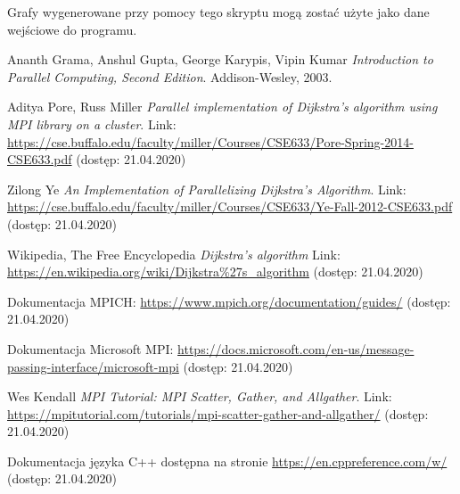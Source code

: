 \documentclass[12pt]{article}
\begin{document}
Grafy wygenerowane przy pomocy tego skryptu mogą zostać użyte jako dane wejściowe do programu.


\newpage
\begin{thebibliography}{9}
Ananth Grama, Anshul Gupta, George Karypis, Vipin Kumar 
\textit{Introduction to Parallel Computing, Second Edition}. 
Addison-Wesley, 2003.

Aditya Pore, Russ Miller
\textit{Parallel implementation of Dijkstra's algorithm using MPI library on a cluster}.
Link: \url{https://cse.buffalo.edu/faculty/miller/Courses/CSE633/Pore-Spring-2014-CSE633.pdf} (dostęp: 21.04.2020)

Zilong Ye
\textit{An Implementation of Parallelizing Dijkstra’s Algorithm}.
Link: \url{https://cse.buffalo.edu/faculty/miller/Courses/CSE633/Ye-Fall-2012-CSE633.pdf} (dostęp: 21.04.2020)

Wikipedia, The Free Encyclopedia
\textit{Dijkstra's algorithm}
Link: \url{https://en.wikipedia.org/wiki/Dijkstra\%27s_algorithm} (dostęp: 21.04.2020)

Dokumentacja MPICH: \url{https://www.mpich.org/documentation/guides/} (dostęp: 21.04.2020)

Dokumentacja Microsoft MPI: \url{https://docs.microsoft.com/en-us/message-passing-interface/microsoft-mpi} (dostęp: 21.04.2020)

Wes Kendall
\textit{MPI Tutorial: MPI Scatter, Gather, and Allgather}.
Link: \url{https://mpitutorial.com/tutorials/mpi-scatter-gather-and-allgather/} (dostęp: 21.04.2020)

Dokumentacja języka C++ dostępna na stronie \url{https://en.cppreference.com/w/} (dostęp: 21.04.2020)


\end{thebibliography}
\end{document}
